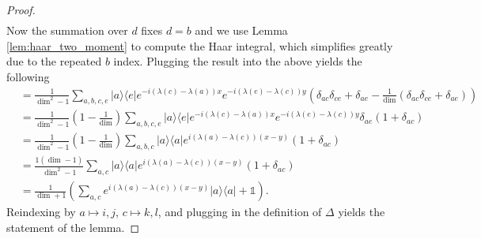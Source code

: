 \documentclass[
 amsmath,amssymb,
 aps,
onecolumn, 
nofootinbib]{revtex4-2}
\newcommand{\ketbra}[2]{| #1\rangle\! \langle #2|}
\newcommand{\parens}[1]{\left( #1 \right)}
\newcommand{\identity}{\mathds{1}}
\begin{document}
\begin{proof}
\begin{align}
    \end{align}
    Now the summation over $d$ fixes $d=b$ and we use Lemma \ref{lem:haar_two_moment} to compute the Haar integral, which simplifies greatly due to the repeated $b$ index. Plugging the result into the above yields the following
    \begin{align}
        &= \frac{1}{\dim^2 - 1} \sum_{a, b, c, e} \ketbra{a}{e} e^{-i (\lambda(c) - \lambda(a))x} e^{-i (\lambda(e) - \lambda(c))y} \parens{\delta_{ac} \delta_{ce} + \delta_{ae} - \frac{1}{\dim} \parens{\delta_{ac} \delta_{ce} + \delta_{ae}}}  \\
        &= \frac{1}{\dim^2 - 1} \parens{1 - \frac{1}{\dim}} \sum_{a, b, c, e} \ketbra{a}{e} e^{-i (\lambda(c) - \lambda(a))x} e^{-i (\lambda(e) - \lambda(c))y} \delta_{ae} (1 + \delta_{ac}) \\
        &= \frac{1}{\dim^2 - 1} \parens{1 - \frac{1}{\dim}} \sum_{a, b, c} \ketbra{a}{a} e^{i (\lambda(a) - \lambda(c))(x-y)} (1 + \delta_{ac}) \\
        &= \frac{1 \parens{\dim - 1}}{\dim^2 - 1} \sum_{a,c} \ketbra{a}{a} e^{i (\lambda(a) - \lambda(c))(x - y)} (1 + \delta_{ac}) \\
        &= \frac{1}{\dim + 1} \parens{\sum_{a,c} e^{i (\lambda(a) - \lambda(c))(x-y)} \ketbra{a}{a} + \identity}.
    \end{align}
    Reindexing by $a \mapsto i,j$, $c \mapsto k,l$, and plugging in the definition of $\Delta$ yields the statement of the lemma.
\end{proof}
\end{document}
